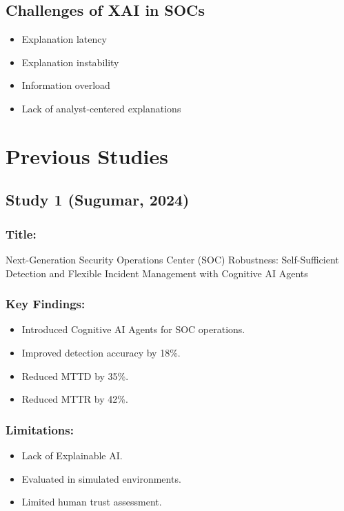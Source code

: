 \documentclass[12pt,a4paper]{report}
\begin{document}
\subsection{Challenges of XAI in SOCs}
\begin{itemize}
    \item Explanation latency
    \item Explanation instability
    \item Information overload
    \item Lack of analyst-centered explanations
\end{itemize}

\section{Previous Studies}
\label{sec:previous_studies}

\subsection{Study 1 (Sugumar, 2024)}

\subsubsection*{Title:}
Next-Generation Security Operations Center (SOC) Robustness: Self-Sufficient Detection and Flexible Incident Management with Cognitive AI Agents

\subsubsection*{Key Findings:}
\begin{itemize}
    \item Introduced Cognitive AI Agents for SOC operations.
    \item Improved detection accuracy by 18\%.
    \item Reduced MTTD by 35\%.
    \item Reduced MTTR by 42\%.
\end{itemize}

\subsubsection*{Limitations:}
\begin{itemize}
    \item Lack of Explainable AI.
    \item Evaluated in simulated environments.
    \item Limited human trust assessment.
\end{itemize}
\end{document}
